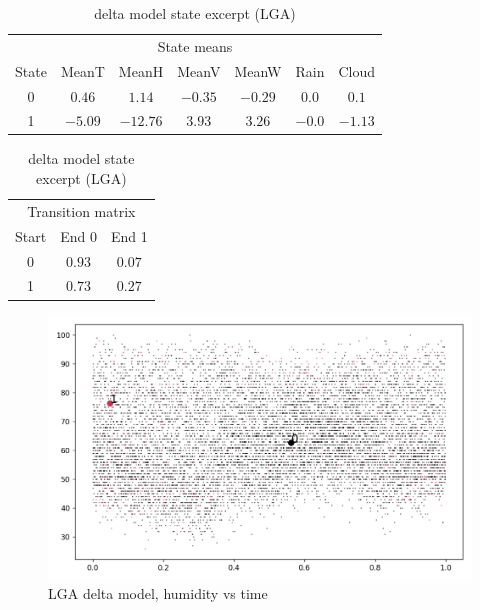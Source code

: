 \documentclass[a4paper]{article}
\begin{document}
\begin{table}[th]
  \caption{delta model state excerpt (LGA)}
  \label{tab:delta}
  \centering

  \begin{tabular}{c c c c c c c}
    \toprule 
    \multicolumn{7}{c}{State means}\\
      State&MeanT & MeanH & MeanV & MeanW & Rain & Cloud  \\
    \midrule
      0 & $ 0.46$  & $ 1.14 $ &  $-0.35$ &  $-0.29$  & $0.0$   &$ 0.1  $ \\
      1 & $-5.09$  & $-12.76$ &  $3.93 $ &  $3.26 $  & $-0.0$  &$-1.13 $  \\
    \bottomrule
  \end{tabular}

  \begin{tabular}{c c c}
    \toprule
    \multicolumn{3}{c}{Transition matrix}\\
    Start & End 0 & End 1 \\
    \midrule  
    0 & $0.93$ & $0.07$ \\
    1 & $0.73$ & $0.27$ \\
    \bottomrule
  \end{tabular}
\end{table}

\begin{figure}[t]
  \centering
  \includegraphics[width=\linewidth]{../png/models/LGA-delta-humidity2.png}
  \caption{LGA delta model, humidity vs time}
  \label{fig:LGA_delta}
\end{figure}
\end{document}
